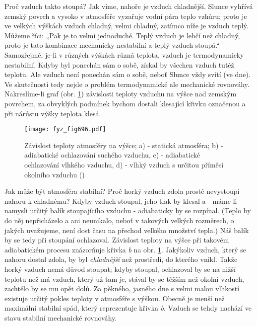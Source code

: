     Proč vzduch takto stoupá? Jak víme, nahoře je vzduch chladnější. Slunce vyhřívá zemský povrch a
    vysoko v atmosféře vyzařuje vodní pára teplo vzhůru; proto je ve velkých výškách vzduch chladný,
    velmi chladný, zatímco níže je vzduch teplý. Můžeme říci: „Pak je to velmi jednoduché. Teplý
    vzduch je lehčí než chladný, proto je tato kombinace mechanicky nestabilní a teplý vzduch
    stoupá.“ Samozřejmě, je-li v různých výškách různá teplota, vzduch je termodynamicky nestabilní.
    Kdyby byl ponechán sám o sobě, získal by všechen vzduch tutéž teplotu. Ale vzduch není ponechán
    sám o sobě, neboť Slunce vždy svítí (ve dne). Ve skutečnosti tedy nejde o problém termodynamické
    ale mechanické rovnováhy. Nakreslíme-li graf (obr. \ref{fyz:fig696}) závislosti teploty vzduchu
    na výšce nad zemským povrchem, za obvyklých podmínek bychom dostali klesající křivku označenou a
    při nárůstu výšky teplota klesá.

    \begin{figure}[ht!] %
      \centering
      \texttt{[image: fyz\_fig696.pdf]}
      \caption{Závislost teploty atmosféry na výšce; a) - statická atmosféra; b) - adiabatické
              ochlazování suchého vzduchu, c) - adiabatické ochlazování vlhkého vzduchu, d) - vlhký
              vzduch s určitou příměsí okolního vzduchu (\cite[s.~707]{Feynman02})}
      \label{fyz:fig696}
    \end{figure}

    Jak může být atmosféra stabilní? Proč horký vzduch zdola prostě nevystoupí nahoru k chladnému?
    Kdyby vzduch stoupal, jeho tlak by klesal a - máme-li namysli určitý balík stoupajícího vzduchu
    - adiabaticky by se rozpínal. (Teplo by do něj nepřicházelo a ani neunikalo, neboť v takových
    velkých rozměrech, o jakých uvažujeme, není dost času na přechod velkého množství tepla.) Náš
    balík by se tedy při stoupání ochlazoval. Závislost teploty na výšce při takovém adiabatickém
    procesu znázorňuje křivka \emph{b} na obr. \ref{fyz:fig696}. Jakýkoliv vzduch, který se nahoru
    dostal zdola, by byl \emph{chladnější} než prostředí, do kterého vnikl. Takže horký vzduch nemá
    důvod stoupat; kdyby stoupal, ochlazoval by se na nižší teplotu než má vzduch, který už tam je,
    stával by se těžším než okolní vzduch, zachtělo by se mu opět dolů. Za pěkného, jasného dne s
    velmi malou vlhkostí existuje určitý pokles teploty v atmosféře s výškou. Obecně je menší než
    maximální stabilní spád, který reprezentuje křivka \emph{b}. Vzduch se tehdy nachází ve stavu
    stabilní mechanické rovnováhy.

